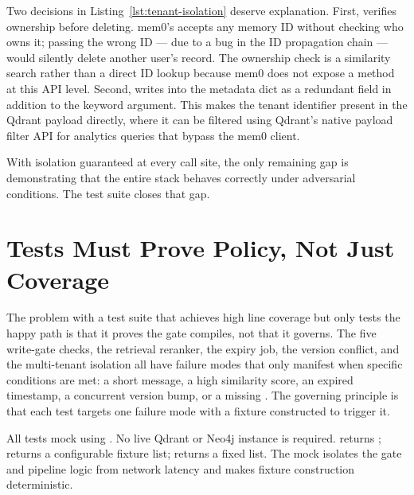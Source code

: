 Two decisions in Listing~\ref{lst:tenant-isolation} deserve explanation. First,
 verifies ownership before deleting. mem0's 
accepts any memory ID without checking who owns it; passing the wrong ID ---
due to a bug in the ID propagation chain --- would silently delete another
user's record. The ownership check is a similarity search rather than a direct
ID lookup because mem0 does not expose a  method at this API
level. Second,  writes  into the metadata dict
as a redundant field in addition to the  keyword argument. This
makes the tenant identifier present in the Qdrant payload directly, where it
can be filtered using Qdrant's native payload filter API for analytics queries
that bypass the mem0 client.

With isolation guaranteed at every call site, the only remaining gap is
demonstrating that the entire stack behaves correctly under adversarial
conditions. The test suite closes that gap.

\section{Tests Must Prove Policy, Not Just Coverage}
\label{sec:test-suite}

The problem with a test suite that achieves high line coverage but only tests
the happy path is that it proves the gate compiles, not that it governs.
The five write-gate checks, the retrieval reranker, the expiry job, the
version conflict, and the multi-tenant isolation all have failure modes that
only manifest when specific conditions are met: a short message, a high
similarity score, an expired timestamp, a concurrent version bump, or a
missing . The governing principle is that each test targets one
failure mode with a fixture constructed to trigger it.

All tests mock  using . No live
Qdrant or Neo4j instance is required.  returns
;  returns a configurable
fixture list;  returns a fixed list. The mock isolates the
gate and pipeline logic from network latency and makes fixture construction
deterministic.

